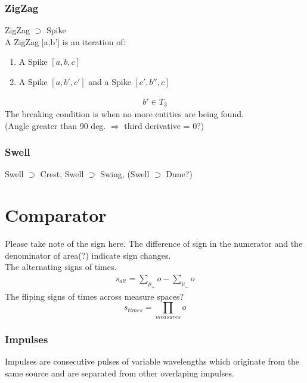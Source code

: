 \documentclass{report}
\begin{document}
\subsection{ZigZag}
ZigZag $\supset$ Spike\\
A ZigZag [a,b'] is an iteration of:
\begin{enumerate}
\item A Spike $[a,b,c]$
\item A Spike $[a,b',c']$ and a Spike $[c',b'',c]$
\end{enumerate}
\begin{align}
b' \in T_{3}
\end{align}
The breaking condition is when no more entities are being found.\\
(Angle greater than 90 deg. $\Rightarrow$ third derivative = 0?)
\subsection{Swell}
Swell $\supset$ Crest, Swell $\supset$ Swing, (Swell $\supset$ Dune?)

\chapter{Comparator}
Please take note of the sign here. The difference of sign in the numerator and the denominator of area(?) indicate sign changes.\\
The alternating signs of times.
\begin{align}
s_{alt} = \sum_{\mu_{+}}^{}o -  \sum_{\mu_{-}}^{}o
\end{align}
The fliping signs of times across measure spaces?
\begin{equation}
s_{times} = \prod_{measures} o
\end{equation}

\subsection{Impulses}
Impulses are consecutive pulses of variable wavelengths which originate from the same source and are separated from other overlaping impulses.
\end{document}
